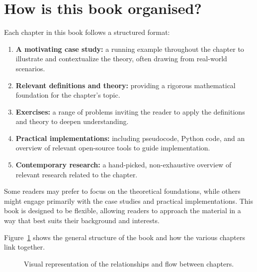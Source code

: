 \section{How is this book organised?}

Each chapter in this book follows a structured format:

\begin{enumerate}
    \item  \textbf{A motivating case study:} a running example throughout the chapter to 
        illustrate and contextualize the theory, often drawing from real-world scenarios.
    \item  \textbf{Relevant definitions and theory:} providing a rigorous mathematical 
        foundation for the chapter’s topic.
    \item  \textbf{Exercises:} a range of problems inviting the reader to apply the definitions 
        and theory to deepen understanding.
    \item  \textbf{Practical implementations:} including pseudocode, Python code, and an 
        overview of relevant open-source tools to guide implementation.
    \item  \textbf{Contemporary research:} a hand-picked, non-exhaustive overview of 
        relevant research related to the chapter.
\end{enumerate}

Some readers may prefer to focus on the theoretical foundations, while others
might engage primarily with the case studies and practical implementations. This
book is designed to be flexible, allowing readers to approach the material in a
way that best suits their background and interests.

Figure~\ref{fig:structure} shows the general structure of the book and how the
various chapters link together.

\begin{figure}[!htbp]
    \newcommand{\imagenode}[3]{ %
            \node (#1) at #2 [label=above:\raisebox{-3em}{{\parbox{4em}{\centering \tiny #3}}}] {\texttt{[image: chapters/\#1/logo/main.pdf]}};
    }
    \begin{center}
    \end{center}
    \caption{Visual representation of the relationships and flow between chapters.}\label{fig:structure}
\end{figure}
